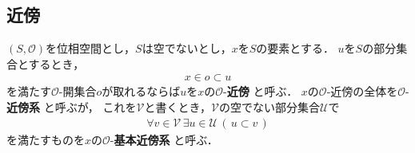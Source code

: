 \subsection{近傍}
	\begin{screen}
		\begin{dfn}[近傍]
			$(S,\mathscr{O})$を位相空間とし，$S$は空でないとし，$x$を$S$の要素とする．
			$u$を$S$の部分集合とするとき，
			\begin{align}
				x \in o \subset u
			\end{align}
			を満たす$\mathscr{O}$-開集合$o$が取れるならば$u$を$x$の$\mathscr{O}$-{\bf 近傍}
			と呼ぶ．
			$x$の$\mathscr{O}$-近傍の全体を$\mathscr{O}$-{\bf 近傍系}
			と呼ぶが，
			これを$\mathcal{V}$と書くとき，$\mathcal{V}$の空でない部分集合$\mathcal{U}$で
			\begin{align}
				\forall v \in \mathcal{V}\, \exists u \in \mathcal{U}\,
				(\, u \subset v\, )
			\end{align}
			を満たすものを$x$の$\mathscr{O}$-{\bf 基本近傍系}
			と呼ぶ．
		\end{dfn}
	\end{screen}
	
